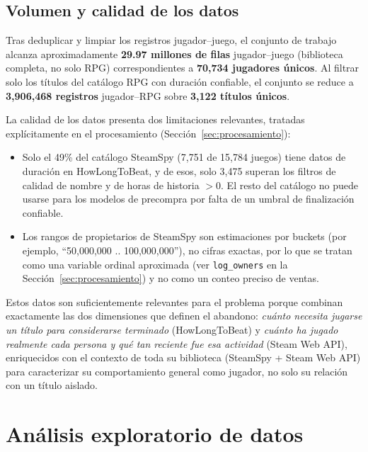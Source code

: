 \documentclass[11pt,letterpaper]{article}
\newcommand{\code}[1]{\texttt{\small #1}}
\begin{document}
\subsection{Volumen y calidad de los datos}

Tras deduplicar y limpiar los registros jugador--juego, el conjunto de trabajo alcanza aproximadamente \textbf{29.97 millones de filas} jugador--juego (biblioteca completa, no solo RPG) correspondientes a \textbf{70{,}734 jugadores únicos}. Al filtrar solo los títulos del catálogo RPG con duración confiable, el conjunto se reduce a \textbf{3{,}906{,}468 registros} jugador--RPG sobre \textbf{3{,}122 títulos únicos}.

La calidad de los datos presenta dos limitaciones relevantes, tratadas explícitamente en el procesamiento (Sección~\ref{sec:procesamiento}):

\begin{itemize}
  \item Solo el 49\% del catálogo SteamSpy (7{,}751 de 15{,}784 juegos) tiene datos de duración en HowLongToBeat, y de esos, solo 3{,}475 superan los filtros de calidad de nombre y de horas de historia $>0$. El resto del catálogo no puede usarse para los modelos de precompra por falta de un umbral de finalización confiable.
  \item Los rangos de propietarios de SteamSpy son estimaciones por buckets (por ejemplo, ``50{,}000{,}000 .. 100{,}000{,}000''), no cifras exactas, por lo que se tratan como una variable ordinal aproximada (ver \code{log\_owners} en la Sección~\ref{sec:procesamiento}) y no como un conteo preciso de ventas.
\end{itemize}

Estos datos son suficientemente relevantes para el problema porque combinan exactamente las dos dimensiones que definen el abandono: \emph{cuánto necesita jugarse un título para considerarse terminado} (HowLongToBeat) y \emph{cuánto ha jugado realmente cada persona y qué tan reciente fue esa actividad} (Steam Web API), enriquecidos con el contexto de toda su biblioteca (SteamSpy + Steam Web API) para caracterizar su comportamiento general como jugador, no solo su relación con un título aislado.

\section{Análisis exploratorio de datos}
\end{document}
